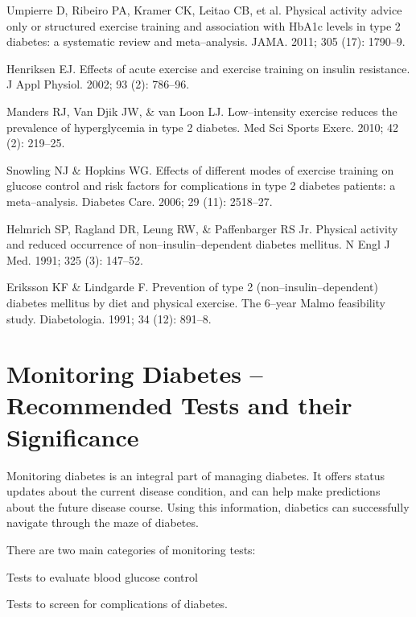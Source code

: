 \begin{thebibliography}{99}
 Umpierre D, Ribeiro PA, Kramer CK, Leitao CB, et al. Physical activity advice only or structured exercise training and association with HbA1c levels in type 2 diabetes: a systematic review and meta–analysis. JAMA. 2011; 305 (17): 1790–9.

  Henriksen EJ. Effects of acute exercise and exercise training on insulin resistance. J Appl Physiol. 2002; 93 (2): 786–96.

  Manders RJ, Van Djik JW, \& van Loon LJ. Low–intensity exercise reduces the prevalence of hyperglycemia in type 2 diabetes. Med Sci Sports Exerc. 2010; 42 (2): 219–25.

  Snowling NJ \& Hopkins WG. Effects of different modes of exercise training on glucose control and risk factors for complications in type 2 diabetes patients: a meta–analysis. Diabetes Care. 2006; 29 (11): 2518–27.

  Helmrich SP, Ragland DR, Leung RW, \& Paffenbarger RS Jr. Physical activity and reduced occurrence of non–insulin–dependent diabetes mellitus. N Engl J Med. 1991; 325 (3): 147–52.

  Eriksson KF \& Lindgarde F. Prevention of type 2 (non–insulin–dependent) diabetes mellitus by diet and physical exercise. The 6–year Malmo feasibility study. Diabetologia. 1991; 34 (12): 891–8.

 \end{thebibliography}


\chapter{Monitoring Diabetes – Recommended Tests and their Significance}

Monitoring diabetes is an integral part of managing diabetes. It offers status updates about the current disease condition, and can help make predictions about the future disease course. Using this information, diabetics can successfully navigate through the maze of diabetes.

There are two main categories of monitoring tests:

\item Tests to evaluate blood glucose control

 \item Tests to screen for complications of diabetes.

